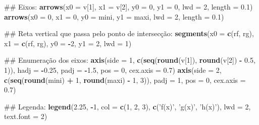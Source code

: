 \documentclass[]{book}
\newenvironment{Shaded}{\begin{snugshade}}{\end{snugshade}}
\newcommand{\KeywordTok}[1]{\textcolor[rgb]{0.13,0.29,0.53}{\textbf{#1}}}
\newcommand{\DataTypeTok}[1]{\textcolor[rgb]{0.13,0.29,0.53}{#1}}
\newcommand{\DecValTok}[1]{\textcolor[rgb]{0.00,0.00,0.81}{#1}}
\newcommand{\FloatTok}[1]{\textcolor[rgb]{0.00,0.00,0.81}{#1}}
\newcommand{\StringTok}[1]{\textcolor[rgb]{0.31,0.60,0.02}{#1}}
\newcommand{\OperatorTok}[1]{\textcolor[rgb]{0.81,0.36,0.00}{\textbf{#1}}}
\newcommand{\NormalTok}[1]{#1}
\begin{document}
\begin{enumerate}
\begin{Shaded}
\begin{Highlighting}[]
\NormalTok{##  Eixos:}
\KeywordTok{arrows}\NormalTok{(}\DataTypeTok{x0 =}\NormalTok{ v[}\DecValTok{1}\NormalTok{], }\DataTypeTok{x1 =}\NormalTok{ v[}\DecValTok{2}\NormalTok{],}
   \DataTypeTok{y0 =} \DecValTok{0}\NormalTok{, }\DataTypeTok{y1 =} \DecValTok{0}\NormalTok{, }\DataTypeTok{lwd =} \DecValTok{2}\NormalTok{, }\DataTypeTok{length =} \FloatTok{0.1}\NormalTok{)}
\KeywordTok{arrows}\NormalTok{(}\DataTypeTok{x0 =} \DecValTok{0}\NormalTok{, }\DataTypeTok{x1 =} \DecValTok{0}\NormalTok{,}
   \DataTypeTok{y0 =}\NormalTok{ mini, }\DataTypeTok{y1 =}\NormalTok{ maxi, }\DataTypeTok{lwd =} \DecValTok{2}\NormalTok{, }\DataTypeTok{length =} \FloatTok{0.1}\NormalTok{)}

\NormalTok{##  Reta vertical que passa pelo ponto de intersecção:}
\KeywordTok{segments}\NormalTok{(}\DataTypeTok{x0 =} \KeywordTok{c}\NormalTok{(rf, rg), }\DataTypeTok{x1 =} \KeywordTok{c}\NormalTok{(rf, rg),}
     \DataTypeTok{y0 =} \OperatorTok{-}\DecValTok{2}\NormalTok{, }\DataTypeTok{y1 =} \DecValTok{2}\NormalTok{, }\DataTypeTok{lwd =} \DecValTok{1}\NormalTok{)}

\NormalTok{##  Enumeração dos eixos:}
\KeywordTok{axis}\NormalTok{(}\DataTypeTok{side =} \DecValTok{1}\NormalTok{, }\KeywordTok{c}\NormalTok{(}\KeywordTok{seq}\NormalTok{(}\KeywordTok{round}\NormalTok{(v[}\DecValTok{1}\NormalTok{]), }\KeywordTok{round}\NormalTok{(v[}\DecValTok{2}\NormalTok{]) }\OperatorTok{-}\StringTok{ }\FloatTok{0.5}\NormalTok{, }\DecValTok{1}\NormalTok{)),}
 \DataTypeTok{hadj =} \OperatorTok{-}\FloatTok{0.25}\NormalTok{, }\DataTypeTok{padj =} \OperatorTok{-}\FloatTok{1.5}\NormalTok{, }\DataTypeTok{pos =} \DecValTok{0}\NormalTok{, }\DataTypeTok{cex.axis =} \FloatTok{0.7}\NormalTok{)}
\KeywordTok{axis}\NormalTok{(}\DataTypeTok{side =} \DecValTok{2}\NormalTok{, }\KeywordTok{c}\NormalTok{(}\KeywordTok{seq}\NormalTok{(}\KeywordTok{round}\NormalTok{(mini) }\OperatorTok{+}\StringTok{ }\DecValTok{1}\NormalTok{, }\KeywordTok{round}\NormalTok{(maxi) }\OperatorTok{-}\StringTok{ }\DecValTok{1}\NormalTok{, }\DecValTok{3}\NormalTok{)),}
 \DataTypeTok{padj =} \DecValTok{1}\NormalTok{, }\DataTypeTok{pos =} \DecValTok{0}\NormalTok{, }\DataTypeTok{cex.axis =} \FloatTok{0.7}\NormalTok{)}

\NormalTok{##  Legenda:}
\KeywordTok{legend}\NormalTok{(}\FloatTok{2.25}\NormalTok{, }\OperatorTok{-}\DecValTok{1}\NormalTok{, }\DataTypeTok{col =} \KeywordTok{c}\NormalTok{(}\DecValTok{1}\NormalTok{, }\DecValTok{2}\NormalTok{, }\DecValTok{3}\NormalTok{), }\KeywordTok{c}\NormalTok{(}\StringTok{'f(x)'}\NormalTok{, }\StringTok{'g(x)'}\NormalTok{, }\StringTok{'h(x)'}\NormalTok{),}
   \DataTypeTok{lwd =} \DecValTok{2}\NormalTok{, }\DataTypeTok{text.font =} \DecValTok{2}\NormalTok{)}


\end{Highlighting}
\end{Shaded}
\end{enumerate}
\end{document}
